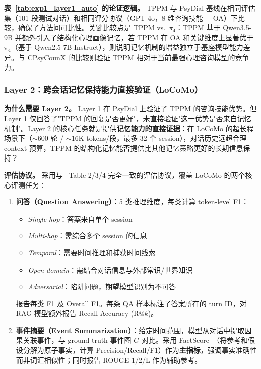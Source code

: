 \documentclass[12pt,a4paper]{article}
\begin{document}
\textbf{表~\ref{tab:exp1_layer1_auto} 的论证逻辑。}
TPPM 与 PsyDial 基线在相同评估集（101 段测试对话）和相同评分协议（GPT-4o，8 维咨询技能 + OA）下比较，确保了方法间可比性。关键比较点是 TPPM vs.\ $\pi_4$：TPPM 基于 Qwen3.5-9B 并额外引入了结构化心理画像记忆，若 TPPM 在 OA 和关键维度上显著优于 $\pi_4$（基于 Qwen2.5-7B-Instruct），则说明记忆机制的增益独立于基座模型能力差异。与 CPsyCounX 的比较则验证 TPPM 相对于当前最强心理咨询模型的竞争力。

\subsubsection{Layer 2：跨会话记忆保持能力直接验证（LoCoMo）}

\textbf{为什么需要 Layer 2。}
Layer 1 在 PsyDial 上验证了 TPPM 的咨询技能优势。但 Layer 1 仅回答了"TPPM 的回复是否更好"，未直接验证"这一优势是否来自记忆机制"。Layer 2 的核心任务就是提供\textbf{记忆能力的直接证据}：在 LoCoMo 的超长程场景下（$\sim$600 轮 / $\sim$16K tokens/段，最多 32 个 session），对话历史远超合理 context 预算，TPPM 的结构化记忆能否提供比其他记忆策略更好的长期信息保持？

\textbf{评估协议。}
采用与~\cite{maharana2024locomo} Table 2/3/4 完全一致的评估协议，覆盖 LoCoMo 的两个核心评测任务：

\begin{enumerate}
  \item \textbf{问答（Question Answering）}：5 类推理维度，每类计算 token-level F1：
  \begin{itemize}
    \item \textit{Single-hop}：答案来自单个 session
    \item \textit{Multi-hop}：需综合多个 session 的信息
    \item \textit{Temporal}：需要时间推理和捕获时间线索
    \item \textit{Open-domain}：需结合对话信息与外部常识/世界知识
    \item \textit{Adversarial}：陷阱问题，期望模型识别为不可答
  \end{itemize}
  报告每类 F1 及 Overall F1。每条 QA 样本标注了答案所在的 turn ID，对 RAG 模型额外报告 Recall Accuracy (R@$k$)。

  \item \textbf{事件摘要（Event Summarization）}：给定时间范围，模型从对话中提取因果关联事件，与 ground truth 事件图 $G$ 对比。采用 FactScore~\cite{min2023factscore}（将参考和假设分解为原子事实，计算 Precision/Recall/F1）作为\textbf{主指标}，强调事实准确性而非词汇相似性；同时报告 ROUGE-1/2/L 作为辅助参考。
\end{enumerate}
\end{document}
